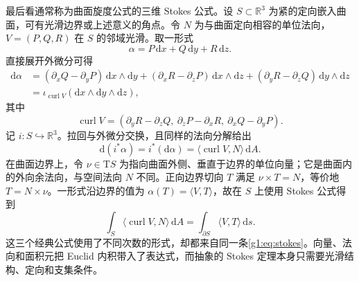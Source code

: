 \ProseParagraphBreak

最后看通常称为曲面旋度公式的三维 Stokes 公式。设 \(S\subset\mathbb R^3\) 为紧的定向嵌入曲面，可有光滑边界或上述意义的角点。令 \(N\) 为与曲面定向相容的单位法向，\(V=(P,Q,R)\) 在 \(S\) 的邻域光滑。取一形式
\[
	\alpha=P\,\mathrm{d}x+Q\,\mathrm{d}y+R\,\mathrm{d}z.
\]
直接展开外微分可得
\[
	\begin{aligned}
		\mathrm{d}\alpha
		&=(\partial_xQ-\partial_yP)\,\mathrm{d}x\wedge\mathrm{d}y
		+(\partial_xR-\partial_zP)\,\mathrm{d}x\wedge\mathrm{d}z
		+(\partial_yR-\partial_zQ)\,\mathrm{d}y\wedge\mathrm{d}z\\
		&=\iota_{\operatorname{curl}V}(\mathrm{d}x\wedge\mathrm{d}y\wedge\mathrm{d}z),
	\end{aligned}
\]
其中
\[
	\operatorname{curl}V
	=(\partial_yR-\partial_zQ,\ \partial_zP-\partial_xR,\ \partial_xQ-\partial_yP).
\]
记 \(i:S\hookrightarrow\mathbb R^3\)。拉回与外微分交换，且同样的法向分解给出
\[
	\mathrm{d}(i^*\alpha)=i^*(\mathrm{d}\alpha)
	=\langle\operatorname{curl}V,N\rangle\,\mathrm{d}A.
\]
在曲面边界上，令 \(\nu\in \mathrm{T}S\) 为指向曲面外侧、垂直于边界的单位向量；它是曲面内的外向余法向，与空间法向 \(N\) 不同。正向边界切向 \(T\) 满足 \(\nu\times T=N\)，等价地 \(T=N\times\nu\)。一形式沿边界的值为 \(\alpha(T)=\langle V,T\rangle\)，故在 \(S\) 上使用 Stokes 公式得到
\begin{equation}\label{g1:eq:curl-surface-stokes}
	\int_S\langle\operatorname{curl}V,N\rangle\,\mathrm{d}A
	=\int_{\partial S}\langle V,T\rangle\,\mathrm{d}s.
\end{equation}
这三个经典公式使用了不同次数的形式，却都来自同一条\eqref{g1:eq:stokes}。向量、法向和面积元把 Euclid 内积带入了表达式，而抽象的 Stokes 定理本身只需要光滑结构、定向和支集条件。

